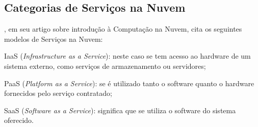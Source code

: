 \subsection{Categorias de Serviços na Nuvem}
\label{s.cloudcategories}

, em seu artigo sobre introdução à Computação na Nuvem, cita os seguintes modelos de Serviços na Nuvem:

\begin{alineas}
  \item IaaS ({\em Infrastructure as a Service}): neste caso se tem acesso ao hardware de um sistema externo, como serviços de armazenamento ou servidores;
  \item PaaS ({\em Platform as a Service}): se é utilizado tanto o software quanto o hardware fornecidos pelo serviço contratado;
  \item SaaS ({\em Software as a Service}): significa que se utiliza o software do sistema oferecido.
\end{alineas}

